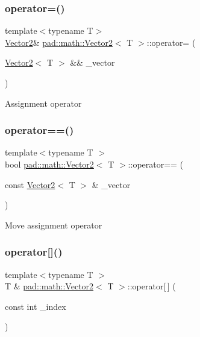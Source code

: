 \subsubsection{\texorpdfstring{operator=()}{operator=()}\hspace{0.1cm}{\footnotesize\ttfamily [3/3]}}
{\footnotesize\ttfamily template$<$typename T$>$ \\
\mbox{\hyperlink{structpad_1_1math_1_1_vector2}{Vector2}}\& \mbox{\hyperlink{structpad_1_1math_1_1_vector2}{pad\+::math\+::\+Vector2}}$<$ T $>$\+::operator= (\begin{DoxyParamCaption}\item[{\mbox{\hyperlink{structpad_1_1math_1_1_vector2}{Vector2}}$<$ T $>$ \&\&}]{\+\_\+vector }\end{DoxyParamCaption})\hspace{0.3cm}{\ttfamily [default]}}

Assignment operator \mbox{\label{structpad_1_1math_1_1_vector2_a972117e74465bc6e610d646943922975}} 
\subsubsection{\texorpdfstring{operator==()}{operator==()}}
{\footnotesize\ttfamily template$<$typename T $>$ \\
bool \mbox{\hyperlink{structpad_1_1math_1_1_vector2}{pad\+::math\+::\+Vector2}}$<$ T $>$\+::operator== (\begin{DoxyParamCaption}\item[{const \mbox{\hyperlink{structpad_1_1math_1_1_vector2}{Vector2}}$<$ T $>$ \&}]{\+\_\+vector }\end{DoxyParamCaption})}

Move assignment operator \mbox{\label{structpad_1_1math_1_1_vector2_ade4a5148be7e09515cf10998aab7a5a0}} 
\subsubsection{\texorpdfstring{operator[]()}{operator[]()}}
{\footnotesize\ttfamily template$<$typename T $>$ \\
T \& \mbox{\hyperlink{structpad_1_1math_1_1_vector2}{pad\+::math\+::\+Vector2}}$<$ T $>$\+::operator\mbox{[}$\,$\mbox{]} (\begin{DoxyParamCaption}\item[{const int}]{\+\_\+index }\end{DoxyParamCaption})}

